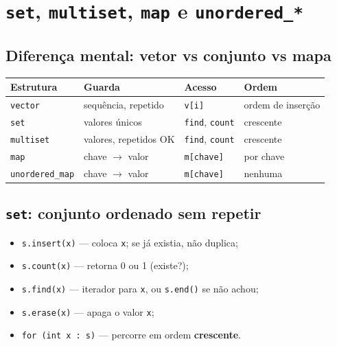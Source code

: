 


\section{\texttt{set}, \texttt{multiset}, \texttt{map} e \texttt{unordered\_*}}

\subsection{Diferença mental: vetor vs conjunto vs mapa}

\begin{center}
\small
\begin{tabular}{@{}p{2.2cm}p{3.5cm}p{3.5cm}p{2.8cm}@{}}
  \toprule
  \textbf{Estrutura} & \textbf{Guarda} & \textbf{Acesso} & \textbf{Ordem} \\
  \midrule
  \texttt{vector} & sequência, repetido & \texttt{v[i]} & ordem de inserção \\
  \texttt{set} & valores únicos & \texttt{find}, \texttt{count} & crescente \\
  \texttt{multiset} & valores, repetidos OK & \texttt{find}, \texttt{count} & crescente \\
  \texttt{map} & chave $\to$ valor & \texttt{m[chave]} & por chave \\
  \texttt{unordered\_map} & chave $\to$ valor & \texttt{m[chave]} & nenhuma \\
  \bottomrule
\end{tabular}
\end{center}

\subsection{\texttt{set}: conjunto ordenado sem repetir}

\begin{itemize}[nosep]
  \item \texttt{s.insert(x)} --- coloca \texttt{x}; se já existia, não duplica;
  \item \texttt{s.count(x)} --- retorna 0 ou 1 (existe?);
  \item \texttt{s.find(x)} --- iterador para \texttt{x}, ou \texttt{s.end()} se não achou;
  \item \texttt{s.erase(x)} --- apaga o valor \texttt{x};
  \item \texttt{for (int x : s)} --- percorre em ordem \textbf{crescente}.
\end{itemize}

